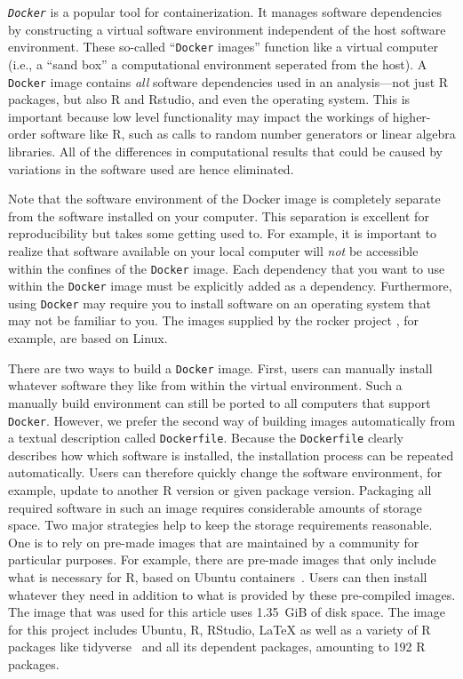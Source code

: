 \documentclass[psych,tutorial,accept,moreauthors,pdftex]{Definitions/mdpi}
\begin{document}
\emph{\texttt{Docker}} is a popular tool for containerization. It
manages software dependencies by constructing a virtual software
environment independent of the host software environment. These
so-called ``\texttt{Docker} images'' function like a virtual computer
(i.e., a ``sand box'' a computational environment seperated from the
host). A \texttt{Docker} image contains \emph{all} software dependencies
used in an analysis---not just R packages, but also R and Rstudio, and
even the operating system. This is important because low level
functionality may impact the workings of higher-order software like R,
such as calls to random number generators or linear algebra libraries.
All of the differences in computational results that could be caused by
variations in the software used are hence eliminated.

Note that the software environment of the Docker image is completely
separate from the software installed on your computer. This separation
is excellent for reproducibility but takes some getting used to. For
example, it is important to realize that software available on your
local computer will \emph{not} be accessible within the confines of the
\texttt{Docker} image. Each dependency that you want to use within the
\texttt{Docker} image must be explicitly added as a dependency.
Furthermore, using \texttt{Docker} may require you to install software
on an operating system that may not be familiar to you. The images
supplied by the rocker project
\citep{boettigerIntroductionRockerDocker2017}, for example, are based on
Linux.

There are two ways to build a \texttt{Docker} image. First, users can
manually install whatever software they like from within the virtual
environment. Such a manually build environment can still be ported to
all computers that support \texttt{Docker}. However, we prefer the
second way of building images automatically from a textual description
called \texttt{Dockerfile}. Because the \texttt{Dockerfile} clearly
describes how which software is installed, the installation process can
be repeated automatically. Users can therefore quickly change the
software environment, for example, update to another R version or given
package version. Packaging all required software in such an image
requires considerable amounts of storage space. Two major strategies
help to keep the storage requirements reasonable. One is to rely on
pre-made images that are maintained by a community for particular
purposes. For example, there are pre-made images that only include what
is necessary for R, based on Ubuntu containers~\citep{boettigerIntroductionRockerDocker2017}. Users can then install
whatever they need in addition to what is provided by these pre-compiled
images. The image that was used for this article uses 1.35~GiB of disk
space. The image for this project includes Ubuntu, R, RStudio, LaTeX as
well as a variety of R packages like tidyverse~\citep{tidyverse} and all
its dependent packages, amounting to 192 R packages.
\end{document}
